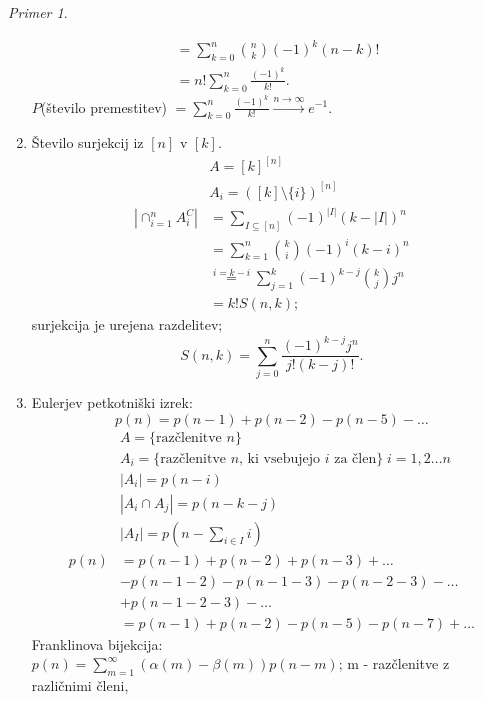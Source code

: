 \documentclass[a4paper, 12pt]{book}
\theoremstyle{definition}
\theoremstyle{remark}
\newtheorem*{ex}{Primer}
\begin{document}
\begin{ex}
\begin{enumerate}[label=(\arabic{*})]
\begin{align*}
        &= \sum_{k=0}^{n} \binom{n}{k} (-1)^k (n-k)! \\
        &= n! \sum_{k=0}^{n} \frac{(-1)^k}{k!}.
      \end{align*}
      $P$(število premestitev) $= \sum_{k=0}^{n} \frac{(-1)^k}{k!} \stackrel{n \to \infty}{\to} e^{-1}$.
    \item Število surjekcij iz $[n]$ v $[k]$.
      \begin{align*}
        &A = [k]^{[n]} \\
        &A_i = ([k] \setminus \{i\})^{[n]} \\
        \left|\cap_{i=1}^n A_i^C\right| &= \sum_{I \subseteq [n]} (-1)^{|I|} (k - |I|)^n \\
        &= \sum_{k=1}^{n} \binom{k}{i} (-1)^i (k-i)^n \\
        &\stackrel{i=k-i}{=} \sum_{j=1}^{k} (-1)^{k-j} \binom{k}{j} j^n \\
        &= k! S(n,k);
      \end{align*}
      surjekcija je urejena razdelitev;
      \begin{equation*}
        S(n,k) = \sum_{j=0}^{n} \frac{(-1)^{k-j} j^n}{j! (k-j)!}.
      \end{equation*}
    \item Eulerjev petkotniški izrek:
      \begin{equation*}
        p(n) = p(n-1) + p(n-2) - p(n-5) - \dots
      \end{equation*}
      \begin{align*}
        &A = \{\text{razčlenitve }n\} \\
        &A_i = \{\text{razčlenitve }n \text{, ki vsebujejo }i \text{ za člen}\} \; i = 1,2 \dots n \\
        &|A_i| = p(n-i) \\
        &|A_i \cap A_j| = p(n-k-j) \\
        &|A_I| = p(n - \sum_{i \in I} i) \\
        p(n) &= p(n-1) + p(n-2) + p(n-3) + \dots \\
        &- p(n-1-2) - p(n-1-3) - p(n-2-3) - \dots \\
        &+ p(n-1-2-3) - \dots \\
        &= p(n-1) + p(n-2) - p(n-5) - p(n-7) + \dots
      \end{align*}
      Franklinova bijekcija: \\
      $p(n) = \sum_{m=1}^{\infty} (\alpha(m) - \beta(m)) p(n-m)$; m - razčlenitve z različnimi členi, \\

\end{enumerate}
\end{ex}
\end{document}

